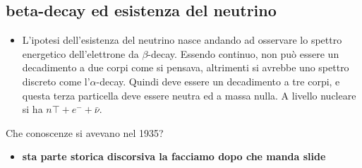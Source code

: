 \subsection{beta-decay ed esistenza del neutrino}
\begin{itemize}
    \item L'ipotesi dell'esistenza del neutrino nasce andando ad osservare lo spettro energetico dell'elettrone da $\beta$-decay. Essendo continuo, non può essere un decadimento a due corpi come si pensava, altrimenti si avrebbe uno spettro discreto come l'$\alpha$-decay. Quindi deve essere un decadimento a tre corpi, e questa terza particella deve essere neutra ed a massa nulla. A livello nucleare si ha $n\top+e^-+\bar{\nu}$. 
\end{itemize}
Che conoscenze si avevano nel 1935?
\begin{itemize}
    \item \textbf{sta parte storica discorsiva la facciamo dopo che manda slide}
\end{itemize}
